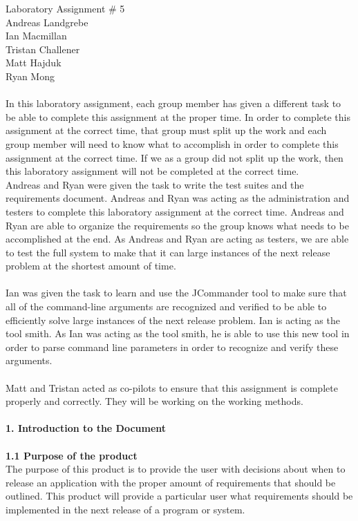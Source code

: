 \documentclass{article}
\begin{document}
\noindent
Laboratory Assignment $\#$ 5
\\
Andreas Landgrebe
\\
Ian Macmillan
\\
Tristan Challener
\\
Matt Hajduk
\\
Ryan Mong 
\\
\\
In this laboratory assignment, each group member has given a different task to be able to complete this assignment at the proper time. In order to complete this assignment at the correct time, that group must split up the work and each group member will need to know what to accomplish in order to complete this assignment at the correct time. If we as a group did not split up the work, then this laboratory assignment will not be completed at the correct time.
\\
Andreas and Ryan were given the task to write the test suites and the requirements document. Andreas and Ryan was acting as the administration and testers to complete this laboratory assignment at the correct time. Andreas and Ryan are able to organize the requirements so the group knows what needs to be accomplished at the end. As Andreas and Ryan are acting as testers, we are able to test the full system to make that it can large instances of the next release problem at the shortest amount of time. 
\\
\\
Ian was given the task to learn and use the JCommander tool to make sure that all of the command-line arguments are recognized and verified to be able to efficiently solve large instances of the next release problem. Ian is acting as the tool smith. As Ian was acting as the tool smith, he is able to use this new tool in order to parse command line parameters in order to recognize and verify these arguments.
\\
\\
Matt and Tristan acted as co-pilots to ensure that this assignment is complete properly and correctly. They will be working on the working methods. 
\\
\\
\textbf{1. Introduction to the Document}
\noindent
\\
\\
\textbf{\hspace{4ex} 1.1 Purpose of the product}
\\
The purpose of this product is to provide the user with decisions about when to release an application with the proper amount of requirements that should be outlined. This product will provide a particular user what requirements should be implemented in the next release of a program or system.
\end{document}
